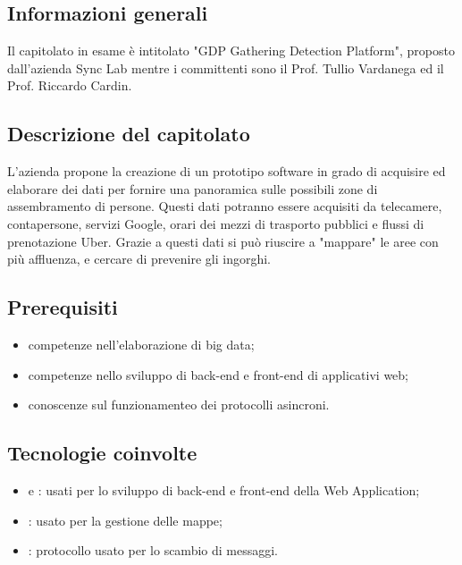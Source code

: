 \subsection{Informazioni generali}
Il capitolato in esame è intitolato "GDP Gathering Detection Platform", proposto dall'azienda Sync Lab mentre i committenti sono il Prof. Tullio Vardanega ed il Prof. Riccardo Cardin.
\subsection{Descrizione del capitolato}
L'azienda propone la creazione di un prototipo software in grado di acquisire ed elaborare dei dati per fornire una panoramica sulle possibili zone di assembramento di persone.
Questi dati potranno essere acquisiti da telecamere, contapersone, servizi Google, orari dei mezzi di trasporto pubblici e flussi di prenotazione Uber.
Grazie a questi dati si può riuscire a "mappare" le aree con più affluenza, e cercare di prevenire gli ingorghi.
\subsection{Prerequisiti}
\begin{itemize}
    \item competenze nell'elaborazione di big data;
    \item competenze nello sviluppo di back-end e front-end di applicativi web;
    \item conoscenze sul funzionamenteo dei protocolli asincroni.
\end{itemize}
\subsection{Tecnologie coinvolte}
\begin{itemize}
    \item {} e : usati per lo sviluppo di back-end e front-end della Web Application;
    \item {}: usato per la gestione delle mappe;
    \item {}: protocollo usato per lo scambio di messaggi.

\end{itemize}
